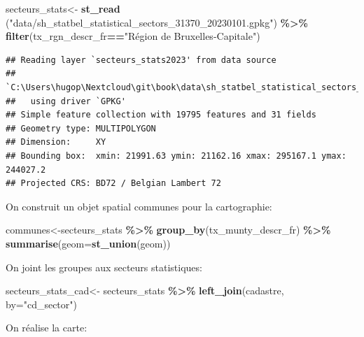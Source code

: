 \documentclass[
]{book}
\newenvironment{Shaded}{\begin{snugshade}}{\end{snugshade}}
\newcommand{\AttributeTok}[1]{\textcolor[rgb]{0.13,0.29,0.53}{#1}}
\newcommand{\FunctionTok}[1]{\textcolor[rgb]{0.13,0.29,0.53}{\textbf{#1}}}
\newcommand{\NormalTok}[1]{#1}
\newcommand{\OtherTok}[1]{\textcolor[rgb]{0.56,0.35,0.01}{#1}}
\newcommand{\SpecialCharTok}[1]{\textcolor[rgb]{0.81,0.36,0.00}{\textbf{#1}}}
\newcommand{\StringTok}[1]{\textcolor[rgb]{0.31,0.60,0.02}{#1}}
\begin{document}
\begin{Shaded}
\begin{Highlighting}[]
\NormalTok{secteurs\_stats}\OtherTok{\textless{}{-}} \FunctionTok{st\_read}\NormalTok{ (}\StringTok{"data/sh\_statbel\_statistical\_sectors\_31370\_20230101.gpkg"}\NormalTok{) }\SpecialCharTok{\%\textgreater{}\%}
  \FunctionTok{filter}\NormalTok{(tx\_rgn\_descr\_fr}\SpecialCharTok{==}\StringTok{"Région de Bruxelles{-}Capitale"}\NormalTok{)}
\end{Highlighting}
\end{Shaded}

\begin{verbatim}
## Reading layer `secteurs_stats2023' from data source 
##   `C:\Users\hugop\Nextcloud\git\book\data\sh_statbel_statistical_sectors_31370_20230101.gpkg' 
##   using driver `GPKG'
## Simple feature collection with 19795 features and 31 fields
## Geometry type: MULTIPOLYGON
## Dimension:     XY
## Bounding box:  xmin: 21991.63 ymin: 21162.16 xmax: 295167.1 ymax: 244027.2
## Projected CRS: BD72 / Belgian Lambert 72
\end{verbatim}

On construit un objet spatial communes pour la cartographie:

\begin{Shaded}
\begin{Highlighting}[]
\NormalTok{communes}\OtherTok{\textless{}{-}}\NormalTok{secteurs\_stats }\SpecialCharTok{\%\textgreater{}\%}
  \FunctionTok{group\_by}\NormalTok{(tx\_munty\_descr\_fr) }\SpecialCharTok{\%\textgreater{}\%}
  \FunctionTok{summarise}\NormalTok{(}\AttributeTok{geom=}\FunctionTok{st\_union}\NormalTok{(geom))}
\end{Highlighting}
\end{Shaded}

On joint les groupes aux secteurs statistiques:

\begin{Shaded}
\begin{Highlighting}[]
\NormalTok{secteurs\_stats\_cad}\OtherTok{\textless{}{-}}\NormalTok{ secteurs\_stats  }\SpecialCharTok{\%\textgreater{}\%}
  \FunctionTok{left\_join}\NormalTok{(cadastre, }\AttributeTok{by=}\StringTok{"cd\_sector"}\NormalTok{)}
\end{Highlighting}
\end{Shaded}

On réalise la carte:
\end{document}
